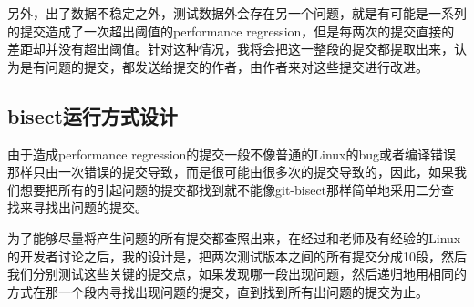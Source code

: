 \documentclass[CJK,12pt]{article}
\begin{document}
另外，出了数据不稳定之外，测试数据外会存在另一个问题，就是有可能是一系列的提交造成了一次超出阈值的performance regression，但是每两次的提交直接的差距却并没有超出阈值。针对这种情况，我将会把这一整段的提交都提取出来，认为是有问题的提交，都发送给提交的作者，由作者来对这些提交进行改进。


\subsection{bisect运行方式设计}
由于造成performance regression的提交一般不像普通的Linux的bug或者编译错误那样只由一次错误的提交导致，而是很可能由很多次的提交导致的，因此，如果我们想要把所有的引起问题的提交都找到就不能像git-bisect那样简单地采用二分查找来寻找出问题的提交。

为了能够尽量将产生问题的所有提交都查照出来，在经过和老师及有经验的Linux的开发者讨论之后，我的设计是，把两次测试版本之间的所有提交分成10段，然后我们分别测试这些关键的提交点，如果发现哪一段出现问题，然后递归地用相同的方式在那一个段内寻找出现问题的提交，直到找到所有出问题的提交为止。
\end{document}
